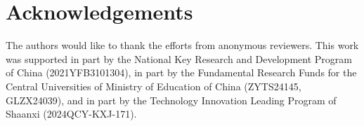 \documentclass[preprint,12pt]{elsarticle}
\begin{document}
 
\section*{Acknowledgements}
The authors would like to thank the efforts from anonymous reviewers.
This work was supported in part by the National Key Research and Development Program of China (2021YFB3101304), in part by the Fundamental Research Funds for the Central Universities of Ministry of Education of China (ZYTS24145, GLZX24039), and in part by the Technology Innovation Leading Program of Shaanxi (2024QCY-KXJ-171).

 

\end{document}

